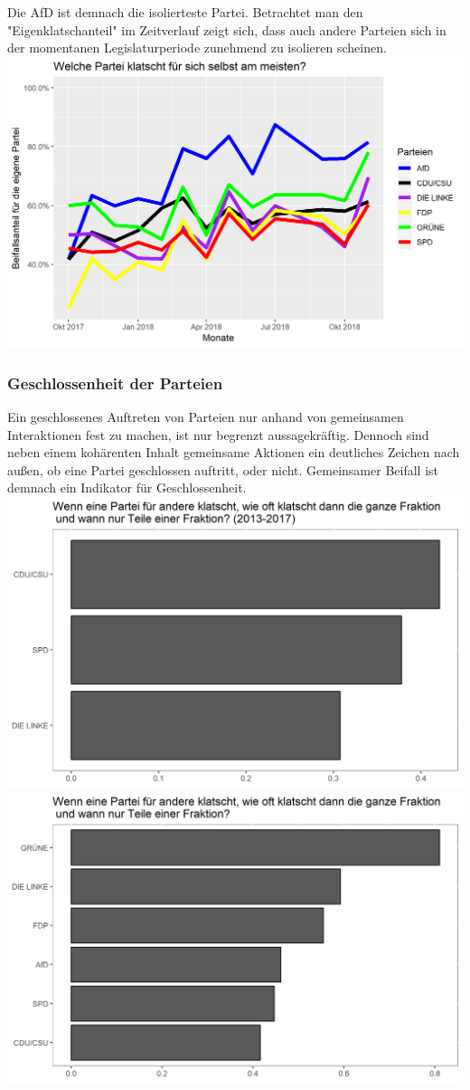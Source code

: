 Die AfD ist demnach die isolierteste Partei. Betrachtet man den "Eigenklatschanteil" im Zeitverlauf zeigt sich, dass auch andere Parteien sich in der momentanen Legislaturperiode zunehmend zu isolieren scheinen.\\
  
\includegraphics[width=\linewidth]{Grafiken/13_17Zeitverlauf_Klatschen.png}\\

\subsubsection{Geschlossenheit der Parteien}
Ein geschlossenes Auftreten von Parteien nur anhand von gemeinsamen Interaktionen fest zu machen, ist nur begrenzt aussagekräftig. Dennoch sind neben einem kohärenten Inhalt gemeinsame Aktionen ein deutliches Zeichen nach außen, ob eine Partei geschlossen auftritt, oder nicht. Gemeinsamer Beifall ist demnach ein Indikator für Geschlossenheit. \\

\includegraphics[width=0.5\linewidth]{Grafiken/Geschlossenheit13.png}
\includegraphics[width=0.5\linewidth]{Grafiken/Geschlossenheit17.png}\\

